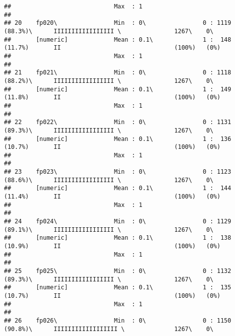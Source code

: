 \documentclass[]{article}
\begin{document}
\begin{verbatim}
##                             Max  : 1                                                                                            
## 
## 20    fp020\                Min  : 0\                0 : 1119 (88.3%)\      IIIIIIIIIIIIIIIII \               1267\    0\       
##       [numeric]             Mean : 0.1\              1 :  148 (11.7%)       II                                (100%)   (0%)     
##                             Max  : 1                                                                                            
## 
## 21    fp021\                Min  : 0\                0 : 1118 (88.2%)\      IIIIIIIIIIIIIIIII \               1267\    0\       
##       [numeric]             Mean : 0.1\              1 :  149 (11.8%)       II                                (100%)   (0%)     
##                             Max  : 1                                                                                            
## 
## 22    fp022\                Min  : 0\                0 : 1131 (89.3%)\      IIIIIIIIIIIIIIIII \               1267\    0\       
##       [numeric]             Mean : 0.1\              1 :  136 (10.7%)       II                                (100%)   (0%)     
##                             Max  : 1                                                                                            
## 
## 23    fp023\                Min  : 0\                0 : 1123 (88.6%)\      IIIIIIIIIIIIIIIII \               1267\    0\       
##       [numeric]             Mean : 0.1\              1 :  144 (11.4%)       II                                (100%)   (0%)     
##                             Max  : 1                                                                                            
## 
## 24    fp024\                Min  : 0\                0 : 1129 (89.1%)\      IIIIIIIIIIIIIIIII \               1267\    0\       
##       [numeric]             Mean : 0.1\              1 :  138 (10.9%)       II                                (100%)   (0%)     
##                             Max  : 1                                                                                            
## 
## 25    fp025\                Min  : 0\                0 : 1132 (89.3%)\      IIIIIIIIIIIIIIIII \               1267\    0\       
##       [numeric]             Mean : 0.1\              1 :  135 (10.7%)       II                                (100%)   (0%)     
##                             Max  : 1                                                                                            
## 
## 26    fp026\                Min  : 0\                0 : 1150 (90.8%)\      IIIIIIIIIIIIIIIIII \              1267\    0\       

\end{verbatim}
\end{document}
